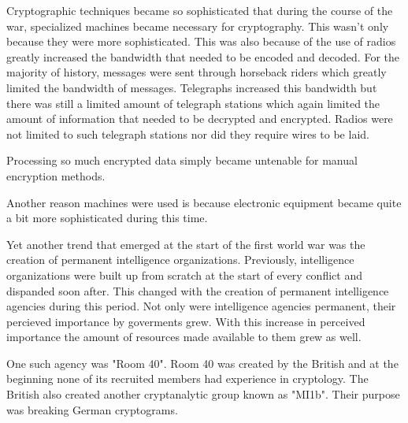 \documentclass{article}
\begin{document}
    Cryptographic techniques became so sophisticated that during the course of the war,
    specialized machines became necessary for cryptography. This wasn't only because
    they were more sophisticated. This was also because of the use of radios greatly
    increased the bandwidth that needed to be encoded and decoded. For the majority of
    history, messages were sent through horseback riders which greatly limited the bandwidth
    of messages. Telegraphs increased this bandwidth but there was still a limited amount
    of telegraph stations which again limited the amount of information that needed
    to be decrypted and encrypted. Radios were not limited to such telegraph stations
    nor did they require wires to be laid.

    Processing so much encrypted data simply became untenable for manual encryption methods.
    
    Another reason machines were used is because electronic equipment became quite a bit
    more sophisticated during this time.

    Yet another trend that emerged at the start of the first world war was the
    creation of permanent intelligence organizations. Previously, intelligence organizations
    were built up from scratch at the start of every conflict and dispanded soon after.
    This changed with the creation of permanent intelligence agencies during this period.
    Not only were intelligence agencies permanent, their percieved importance by goverments
    grew. With this increase in perceived importance the amount of resources made available
    to them grew as well.

    One such agency was "Room 40". Room 40 was created by the British and at the beginning
    none of its recruited members had experience in cryptology. The British also
    created another cryptanalytic group known as "MI1b". Their purpose was breaking
    German cryptograms.
\end{document}
